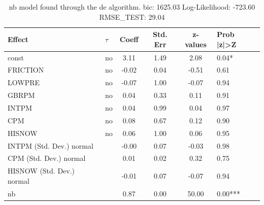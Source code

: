 \begin{table}
	\caption{nb model found through the de algorithm. bic: 1625.03 Log-Likelihood: -723.60 RMSE_TEST: 29.04}
	\begin{center}
		\begin{tabular}{|l|l|c|c|c|l|}
			\hline
			Effect & $\tau$ & Coeff & Std. Err & z-values & Prob |z|>Z \\
			\hline
			const & no & 3.11 & 1.49 & 2.08 & 0.04* \\
			\hline
			FRICTION & no & -0.02 & 0.04 & -0.51 & 0.61 \\
			\hline
			LOWPRE & no & -0.07 & 1.00 & -0.07 & 0.94 \\
			\hline
			GBRPM & no & 0.04 & 0.33 & 0.11 & 0.91 \\
			\hline
			INTPM & no & 0.04 & 0.99 & 0.04 & 0.97 \\
			\hline
			CPM & no & 0.08 & 0.67 & 0.12 & 0.90 \\
			\hline
			HISNOW & no & 0.06 & 1.00 & 0.06 & 0.95 \\
			\hline
			INTPM (Std. Dev.) normal &  & -0.00 & 0.07 & -0.03 & 0.98 \\
			\hline
			CPM (Std. Dev.) normal &  & 0.01 & 0.02 & 0.32 & 0.75 \\
			\hline
			HISNOW (Std. Dev.) normal &  & -0.01 & 0.07 & -0.07 & 0.94 \\
			\hline
			nb &  & 0.87 & 0.00 & 50.00 & 0.00*** \\
			\hline
		\end{tabular}
	\end{center}
\end{table}